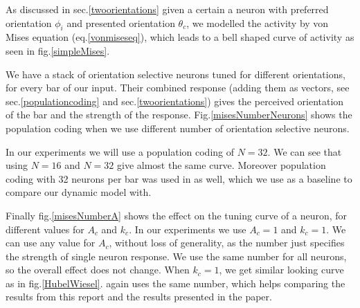 As discussed in sec.\ref{twoorientations} given a certain a neuron with preferred orientation $\phi_{i}$ and presented orientation $\theta_{c}$, we modelled the activity by von Mises equation (eq.\ref{vonmiseseq}), which leads to a bell shaped curve of activity as seen in fig.\ref{simpleMises}.




We have a stack of orientation selective neurons tuned for different orientations, for every bar of our input. Their combined response (adding them as vectors, see sec.\ref{populationcoding} and sec.\ref{twoorientations}) gives the perceived orientation of the bar and the strength of the response. Fig.\ref{misesNumberNeurons} shows the population coding when we use different number of orientation selective neurons.


In our experiments we will use a population coding of $N=32$. We can see that using $N=16$ and $N=32$ give almost the same curve. Moreover population coding with 32 neurons per bar was used in \cite{keemink2015unified} as well, which we use as a baseline to compare our dynamic model with.

Finally fig.\ref{misesNumberA} shows the effect on the tuning curve of a neuron, for different values for $A_{c}$ and $k_{c}$. In our experiments we use $A_{c}=1$ and $k_{c}=1$. We can use any value for $A_{c}$, without loss of generality, as the number just specifies the strength of single neuron response. We use the same number for all neurons, so the overall effect does not change. When $k_{c}=1$, we get similar looking curve as in fig.\ref{HubelWiesel}. \cite{keemink2015unified} again uses the same number, which helps comparing the results from this report and the results presented in the paper.




